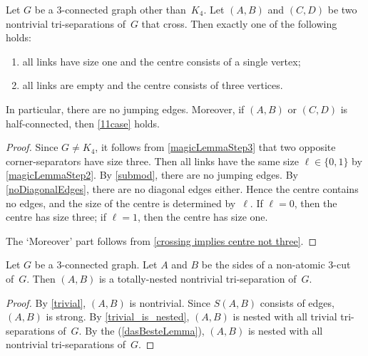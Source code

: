 \documentclass{aic}
\theoremstyle{plain}
\theoremstyle{definition}
\theoremstyle{plain}
\theoremstyle{plain}
\begin{document}
\begin{lem}\label{dasBesteLemma}
Let $G$ be a 3-connected graph other than~$K_4$.
Let $(A,B)$ and $(C,D)$ be two nontrivial tri-separations of~$G$ that cross.
Then exactly one of the following holds:
\begin{enumerate}
    \item\label{11case} all links have size one and the centre consists of a single vertex;
    \item\label{3case} all links are empty and the centre consists of three vertices.
\end{enumerate}
In particular, there are no jumping edges.
Moreover, if $(A,B)$ or $(C,D)$ is half-connected, then \ref{11case} holds.
\end{lem}
\begin{proof}
Since $G\neq K_4$, it follows from \autoref{magicLemmaStep3} that two opposite corner-separators have size three.
Then all links have the same size $\ell\in\{0,1\}$ by \autoref{magicLemmaStep2}.
By \autoref{submod}, there are no jumping edges.
By \autoref{noDiagonalEdges}, there are no diagonal edges either.
Hence the centre contains no edges, and the size of the centre is determined by~$\ell$.
If $\ell=0$, then the centre has size three; if $\ell=1$, then the centre has size one.

The `Moreover' part follows from \autoref{crossing implies centre not three}.
\end{proof}

\begin{cor}\label{3cutsAreNested}
Let $G$ be a 3-connected graph.
Let $A$ and $B$ be the sides of a non-atomic 3-cut of~$G$.
Then $(A,B)$ is a totally-nested nontrivial tri-separation of~$G$.
\end{cor}
\begin{proof}
By \autoref{trivial}, $(A,B)$ is nontrivial.
Since $S(A,B)$ consists of edges, $(A,B)$ is strong.
By \autoref{trivial_is_nested}, $(A,B)$ is nested with all trivial tri-separations of~$G$.
By the  (\ref{dasBesteLemma}), $(A,B)$ is nested with all nontrivial tri-separations of~$G$.
\end{proof}
\end{document}
